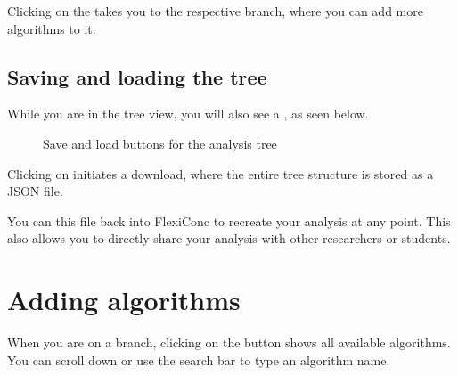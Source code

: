 \documentclass[letterpaper,10pt,english]{sphinxmanual}
\begin{document}
\sphinxAtStartPar
Clicking on the  takes you to the
respective branch, where you can add more algorithms to it.


\subsection{Saving and loading the tree}
\label{\detokenize{clicanalysis/flexiconc:saving-and-loading-the-tree}}
\sphinxAtStartPar
While you are in the tree view, you will also see a , as seen below.

\begin{figure}[htbp]
\centering
\capstart

\noindent{}
\caption{Save and load buttons for the analysis tree}\label{\detokenize{clicanalysis/flexiconc:id5}}\label{\detokenize{clicanalysis/flexiconc:flexiclic-save-tree}}\end{figure}

\sphinxAtStartPar
Clicking on  initiates a download, where the entire tree
structure is stored as a JSON file.

\sphinxAtStartPar
You can  this file back into FlexiConc to recreate your analysis
at any point. This also allows you to directly share your analysis with
other researchers or students.


\section{Adding algorithms}
\label{\detokenize{clicanalysis/flexiconc:adding-algorithms}}
\sphinxAtStartPar
When you are on a branch, clicking on the  button shows
all available algorithms. You can scroll down or use the search bar to
type an algorithm name.
\end{document}
